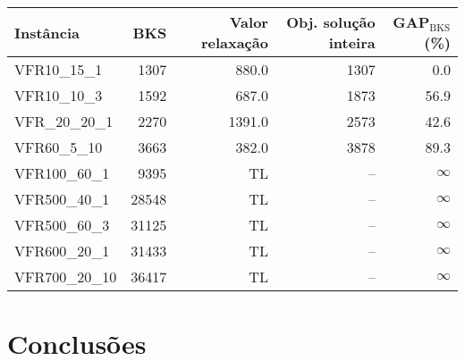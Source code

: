 \documentclass[12pt]{article}
\begin{document}
\begin{table}[ht]
   \begin{tabular}{lrrrr}
      \toprule
      Instância & BKS & Valor relaxação & Obj. solução inteira & GAP$_\mathrm{BKS}$ (\%) \\
      \midrule
      VFR10\_15\_1 & 1307 & 880.0 & 1307 & \phantom{0}0.0\\
      VFR10\_10\_3 & 1592 & 687.0 & 1873 & 56.9\\
      VFR\_20\_20\_1 & 2270 & 1391.0 & 2573 & 42.6\\
      VFR60\_5\_10 & 3663 & 382.0 & 3878 & 89.3\\
      VFR100\_60\_1 & 9395  &  TL & -- & $\infty$\\
      VFR500\_40\_1 & 28548 &  TL & -- & $\infty$\\
      VFR500\_60\_3 & 31125 &  TL & -- & $\infty$\\
      VFR600\_20\_1 & 31433 &  TL & -- & $\infty$\\
      VFR700\_20\_10 & 36417 & TL & -- & $\infty$\\ 
      \bottomrule
   \end{tabular}
\end{table}

\section{Conclusões}
\end{document}
